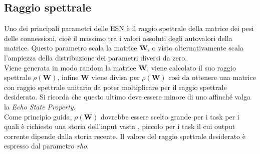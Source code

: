 \subsection{Raggio spettrale}
Uno dei principali parametri delle ESN è il raggio spettrale della matrice dei pesi delle connessioni, cioè il massimo tra i valori assoluti degli autovalori della matrice. Questo parametro scala la matrice $\mathbf{W}$, o visto alternativamente scala l'ampiezza della distribuzione dei parametri diversi da zero.\\
Viene generata in modo random la matrice \textbf{W}, viene calcolato il suo raggio spettrale $\rho(\mathbf{W})$, infine \textbf{W} viene divisa per $\rho(\mathbf{W})$ così da ottenere una matrice con raggio spettrale unitario da poter moltiplicare per il raggio spettrale desiderato. Si ricorda che questo ultimo deve essere minore di uno affinché valga la \textit{Echo State Property}.\\
Come principio guida, $\rho(\mathbf{W})$ dovrebbe essere scelto grande per i task per i quali è richiesto una storia dell'input vasta , piccolo per i task il cui output corrente dipende dalla storia recente.
Il valore del raggio spettrale desiderato è espresso dal parametro \textit{rho}.

